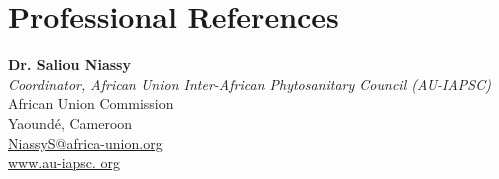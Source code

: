 
\section{Professional References}

\textbf{Dr. Saliou Niassy} \\
\textit{Coordinator, African Union Inter-African Phytosanitary Council (AU-IAPSC)} \\
African Union Commission \\
Yaoundé, Cameroon \\
\href{mailto:NiassyS@africa-union.org}{NiassyS@africa-union.org} \\
\href{https://au-iapsc.org}{www.au-iapsc.
org}